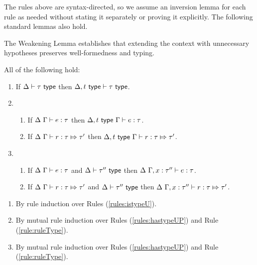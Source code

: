 {{{{The rules above are syntax-directed, so we assume an inversion lemma for each rule as needed without stating it separately or proving it explicitly. The following standard lemmas also hold.

The Weakening Lemma establishes that extending the context with unnecessary hypotheses preserves well-formedness and typing.
\begin{lemma}[Weakening]\label{lemma:weakening-UP} All of the following hold: 
\begin{enumerate} 
\item If $\Delta \vdash \tau~\mathsf{type}$ then $\Delta, t~\mathsf{type} \vdash \tau~\mathsf{type}$.
\item \begin{enumerate}
  \item If $\Delta~\Gamma \vdash e : \tau$ then $\Delta, t~\mathsf{type}~\Gamma \vdash e : \tau$.
  \item If $\Delta~\Gamma \vdash r : \tau \Mapsto \tau'$ then $\Delta, t~\mathsf{type}~\Gamma \vdash r : \tau \Mapsto \tau'$.
  \end{enumerate}
\item \begin{enumerate}
  \item If $\Delta~\Gamma \vdash e : \tau$ and $\Delta \vdash \tau''~\mathsf{type}$ then $\Delta~\Gamma, x : \tau'' \vdash e : \tau$.
  \item If $\Delta~\Gamma \vdash r : \tau \Mapsto \tau'$ and $\Delta \vdash \tau''~\mathsf{type}$ then $\Delta~\Gamma, x : \tau'' \vdash r : \tau \Mapsto \tau'$.
  \end{enumerate}
\end{enumerate}
\end{lemma}
\begin{proof-sketch}
\begin{enumerate}
\item By rule induction over Rules (\ref{rules:istypeU}).
\item By mutual rule induction over Rules (\ref{rules:hastypeUP}) and Rule (\ref{rule:ruleType}).
\item By mutual rule induction over Rules (\ref{rules:hastypeUP}) and Rule (\ref{rule:ruleType}).
\end{enumerate}
\end{proof-sketch}

}}}}
